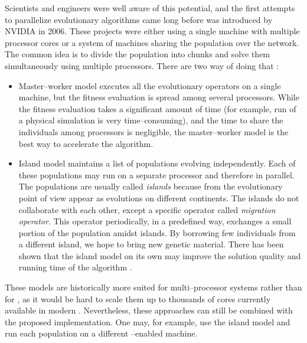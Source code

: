 Scientists and engineers were well aware of this potential, and the first attempts to parallelize evolutionary algorithms came long before \cuda was introduced by NVIDIA \citep{PGAPack} in 2006. These projects were either using a single machine with multiple processor cores or a system of machines sharing the population over the network. The common idea is to divide the population into chunks and solve them simultaneously using multiple processors. There are two way of doing that \citep{CHENG2019514}:
\begin{itemize}
    \item Master--worker model executes all the evolutionary operators on a single machine, but the fitness evaluation is spread among several processors. While the fitness evaluation takes a significant amount of time (for example, run of a physical simulation is very time--consuming), and the time to share the individuals among processors is negligible, the master--worker model is the best way to accelerate the algorithm.
    \item Island model maintains a list of populations evolving independently. Each of these populations may run on a separate processor and therefore in parallel. The populations are usually called \emph{islands} because from the evolutionary point of view appear as evolutions on different continents. The islands do not collaborate with each other, except a specific operator called \emph{migration operator}. This operator periodically, in a predefined way, exchanges a small portion of the population amidst islands. By borrowing few individuals from a different island, we hope to bring new genetic material. There has been shown that the island model on its own may improve the solution quality and running time of the algorithm \citep{IslandModel}.
\end{itemize}
These models are historically more suited for multi--processor systems rather than for \gpuns, as it would be hard to scale them up to thousands of cores currently available in modern \gpuns. Nevertheless, these approaches can still be combined with the proposed implementation. One may, for example, use the island model and run each population on a different \gpuns--enabled machine.

